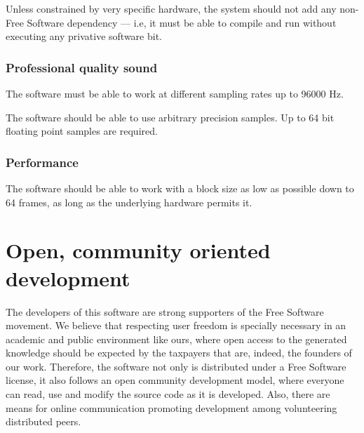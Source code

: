 \begin{requirement}\label{req:free}
Unless constrained by very specific hardware, the system should not
add any non-Free Software dependency --- i.e, it must be able to
compile and run without executing any privative software bit. 
\end{requirement}

\subsubsection{Professional quality sound}

\begin{requirement}
\label{req:iter1-begin2}
The software must be able to work at different sampling rates up to
96000 Hz.
\end{requirement}

\begin{requirement}
\label{req:iter1-end2}
The software should be able to use arbitrary precision samples. Up to
64 bit floating point samples are required.
\end{requirement}

\subsubsection{Performance}

\begin{requirement}[Latency]
  The software should be able to work with a block size as low as
  possible down to 64 frames, as long as the underlying hardware
  permits it.
\end{requirement}

\section{Open, community oriented development}

The developers of this software are strong supporters of the Free
Software movement. We believe that respecting user freedom is
specially necessary in an academic and public environment like ours,
where open access to the generated knowledge should be expected by the
taxpayers that are, indeed, the founders of our work. Therefore, the
software not only is distributed under a Free Software license, it
also follows an open community development model, where everyone can
read, use and modify the source code as it is developed. Also, there
are means for online communication promoting development among
volunteering distributed peers.

